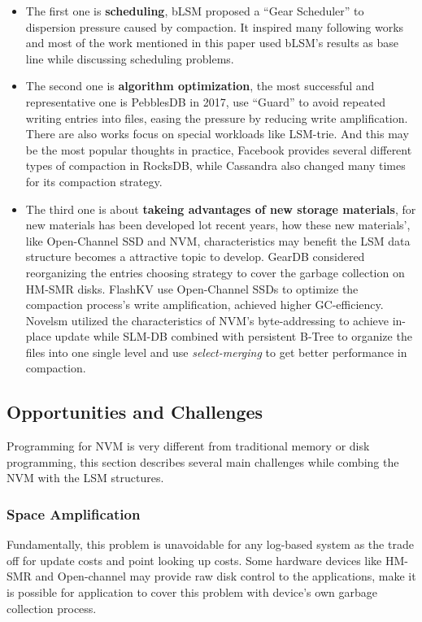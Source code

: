 \begin{itemize}
	\item The first one is \textbf{scheduling},  bLSM\cite{sears2012blsm} proposed a ``Gear Scheduler'' to dispersion pressure caused by compaction. It inspired many following works and most of the work mentioned in this paper used bLSM's results as base line while discussing scheduling problems. 
	\item 	The second one is \textbf{algorithm optimization}, the most successful and representative one is PebblesDB in 2017\cite{raju2017pebblesdb}, use ``Guard'' to avoid repeated writing entries into files, easing the pressure by reducing write amplification. There are also works focus on special workloads like LSM-trie\cite{wu2015lsm}. And this may be the most popular thoughts in practice, Facebook provides several different types of compaction in RocksDB\cite{Compacti60:online},\cite{dong2017optimizing} while Cassandra also changed many times for its compaction strategy\cite{Document20:online}.  
	\item The third one is about \textbf{takeing advantages of new storage materials}, for new materials has been developed lot recent years, how these new materials', like Open-Channel SSD\cite{bjorling2017lightnvm} and NVM, characteristics may benefit the LSM data structure becomes a attractive topic to develop. GearDB\cite{yao2019geardb} considered reorganizing the entries choosing strategy to cover the garbage collection on HM-SMR disks. FlashKV\cite{zhang2017flashkv} use Open-Channel SSDs to optimize the compaction process's write amplification, achieved higher GC-efficiency. Novelsm\cite{kannan2018redesigning} utilized the characteristics of NVM's byte-addressing to achieve in-place update while SLM-DB\cite{kaiyrakhmet2019slm} combined with persistent B-Tree to organize the files into one single level and use \textit{select-merging} to get better performance in compaction.
\end{itemize}

\subsection{Opportunities and Challenges}
Programming for NVM is very different from traditional memory or disk programming, this section describes several main challenges while combing the NVM with the LSM structures.

\subsubsection{Space Amplification}
Fundamentally, this problem is unavoidable for any log-based system as the trade off for update costs and point looking up costs. Some hardware devices like HM-SMR and Open-channel may provide raw disk control to the applications, make it is possible for application to cover this problem with device's own garbage collection process\cite{zhang2017flashkv}.

